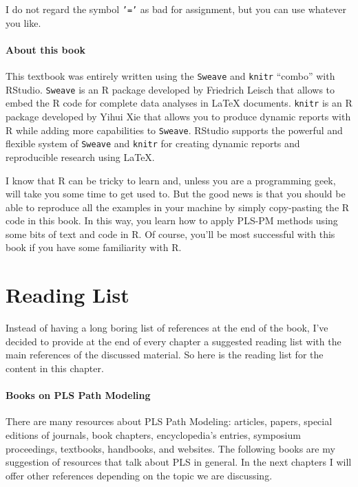 \documentclass[12pt]{book}\usepackage{graphicx, color}
\newcommand{\code}[1]{\texttt{#1}}
\begin{document}
I do not regard the symbol \code{'='} as bad for assignment, but you can use whatever you like. 

\paragraph{About this book}
This textbook was entirely written using the \code{Sweave} and \code{knitr} ``combo'' with RStudio. \code{Sweave} is an R package developed by Friedrich Leisch that allows to embed the R code for complete data analyses in LaTeX documents. \code{knitr} is an R package developed by Yihui Xie that allows you to produce dynamic reports with R while adding more capabilities to \code{Sweave}. RStudio supports the powerful and flexible system of \code{Sweave} and \code{knitr} for creating dynamic reports and reproducible research using LaTeX.

I know that R can be tricky to learn and, unless you are a programming geek, will take you some time to get used to. But the good news is that you should be able to reproduce all the examples in your machine by simply copy-pasting the R code in this book. In this way, you learn how to apply PLS-PM methods using some bits of text and code in R. Of course, you'll be most successful with this book if you have some familiarity with R.





\section{Reading List}
Instead of having a long boring list of references at the end of the book, I've decided to provide at the end of every chapter a suggested reading list with the main references of the discussed material. So here is the reading list for the content in this chapter.

\paragraph{Books on PLS Path Modeling}
There are many resources about PLS Path Modeling: articles, papers, special editions of journals, book chapters, encyclopedia's entries, symposium proceedings, textbooks, handbooks, and websites. The following books are my suggestion of resources that talk about PLS in general. In the next chapters I will offer other references depending on the topic we are discussing.
\end{document}

